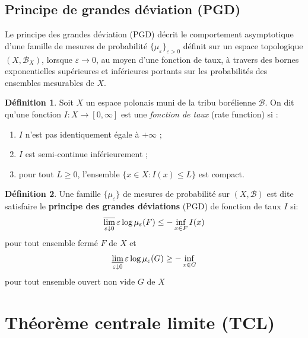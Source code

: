 \documentclass[12pt,a4paper,twoside]{book}%
\theoremstyle{definition}
\newtheorem{dfn}{Définition}[section]
\numberwithin{equation}{section}
\begin{document}
\subsection{Principe de grandes déviation (PGD)}
Le principe des grandes déviation (PGD) décrit le comportement asymptotique d'une famille de mesures de probabilité $\{\mu_\varepsilon\}_{\varepsilon>0}$ définit sur un espace topologique $(X,\mathcal{B}_X)$, lorsque $\varepsilon \to 0$, au moyen d'une fonction de taux, à travers des bornes exponentielles supérieures et inférieures portants sur les probabilités des ensembles mesurables de $X$.
\begin{dfn}
	Soit $X$ un espace polonais muni de la tribu borélienne $\mathcal{B}$.  
	On dit qu’une fonction $I : X \to [0, \infty]$ est une \emph{fonction de taux} (rate function) si :  
	\begin{enumerate}
		\item $I$ n’est pas identiquement égale à $+\infty$ ;
		\item $I$ est semi-continue inférieurement ;
		\item pour tout $L \geq 0$, l’ensemble $\{x \in X : I(x) \leq L\}$ est compact.
	\end{enumerate}
\end{dfn}

\begin{dfn}
	Une famille $\{\mu_\varepsilon\}$ de mesures de probabilité sur $(X, \mathcal{B})$ 
	est dite satisfaire le \textbf{principe des grandes déviations} (PGD) 
	de fonction de taux $I$ si:
	\begin{equation}
		\varlimsup_{\varepsilon \downarrow 0} \varepsilon\log\mu_\varepsilon (F)\leq -\inf_{x\in F}I(x)
	\end{equation}
	pour tout ensemble fermé $F$ de $X$ et
	\begin{equation}
	\varliminf_{\varepsilon \downarrow 0} \varepsilon\log\mu_\varepsilon(G)\geq -\inf_{x\in G}
	\end{equation}
	pour tout ensemble ouvert non vide $G$ de $X$  
	\end{dfn}

\section{Théorème centrale limite (TCL)}
\end{document}
